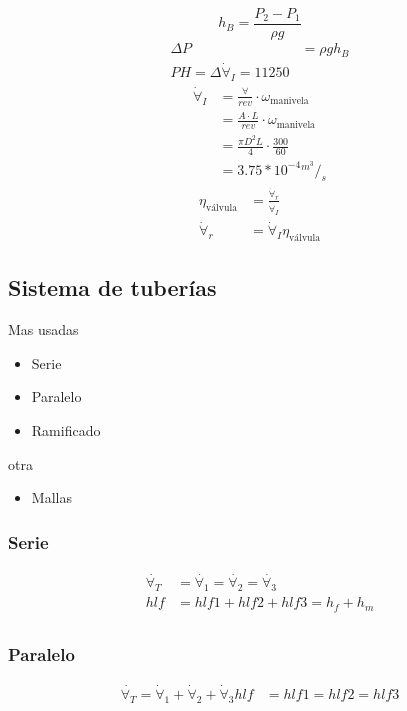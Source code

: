 \[
    h_{B} = \frac{ P_{2} - P_{1} }{ \rho g }
\]
\[
    \begin{split}
        \Delta P & = \rho g  h_{B} \\
        PH = \Delta \dot{\forall}_{I} = 11250
    \end{split}
\]
\[
    \begin{split}
        \dot{\forall}_{I} & = \frac{ \forall }{ rev } \cdot \omega_{\text{manivela}} \\
        & = \frac{ A \cdot L }{ rev } \cdot \omega_{\text{manivela}} \\
        & = \frac{ \pi D^{2} L }{ 4 } \cdot \frac{ 300 }{ 60 } \\
        & = 3.75 * 10^{-4} {}^{ m^{3} }/_{s}
    \end{split}
\]
\[
    \begin{split}
        \eta_{\text{válvula}} & = \frac{ \dot{\forall}_{r} }{ \dot{\forall}_{I} } \\
        \dot{\forall}_{r} & = \dot{\forall}_{I} \eta_{\text{válvula}}
    \end{split}
\]


\subsection{Sistema de tuberías}
Mas usadas
\begin{itemize}
    \item Serie
    \item Paralelo
    \item Ramificado
\end{itemize}
otra
\begin{itemize}
    \item Mallas
\end{itemize}

\subsubsection{Serie}
\[
    \begin{split}
        \dot{ \forall_{T} } & = \dot{ \forall_{1} } = \dot{ \forall_{2} } = \dot{ \forall_{3} } \\
        hlf & = hlf1 + hlf2 + hlf3 = h_{f} + h_{m} \\
    \end{split}
\]      

\subsubsection{Paralelo}
\[
    \begin{split}
        \dot{ \forall_{T} } = \dot{ \forall }_{1} + \dot{ \forall }_{2} + \dot{ \forall }_{3}
        hlf & = hlf1 = hlf2 = hlf3 \\
    \end{split}
\]

